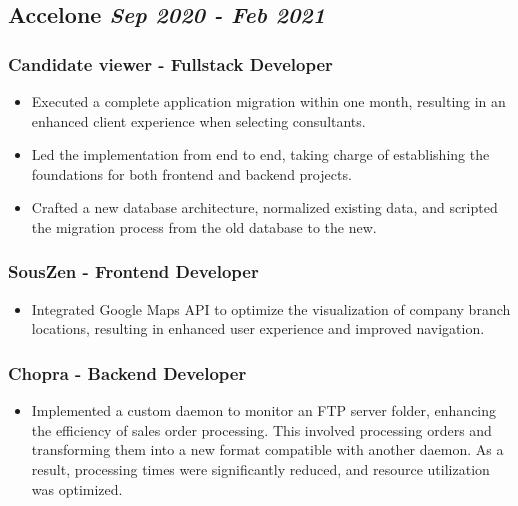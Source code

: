 \documentclass[10pt, a4paper]{article}
\begin{document}
\subsection*{Accelone \hfill \small \textit{Sep 2020 - Feb 2021}}

\subsubsection*{Candidate viewer - Fullstack Developer}
\begin{itemize}
    \setlength\itemsep{0em}
    \item Executed a complete application migration within one month, resulting in an enhanced client experience when selecting consultants.
    \item Led the implementation from end to end, taking charge of establishing the foundations for both frontend and backend projects.
    \item Crafted a new database architecture, normalized existing data, and scripted the migration process from the old database to the new.
\end{itemize}

\subsubsection*{SousZen - Frontend Developer}
\begin{itemize}
    \setlength\itemsep{0em}
    \item Integrated Google Maps API to optimize the visualization of company branch locations, resulting in enhanced user experience and improved navigation.
\end{itemize}

\subsubsection*{Chopra - Backend Developer}
\begin{itemize}
    \setlength\itemsep{0em}
    \item Implemented a custom daemon to monitor an FTP server folder, enhancing the efficiency of sales order processing. This involved processing orders and transforming them into a new format compatible with another daemon. As a result, processing times were significantly reduced, and resource utilization was optimized.
\end{itemize}
\end{document}
